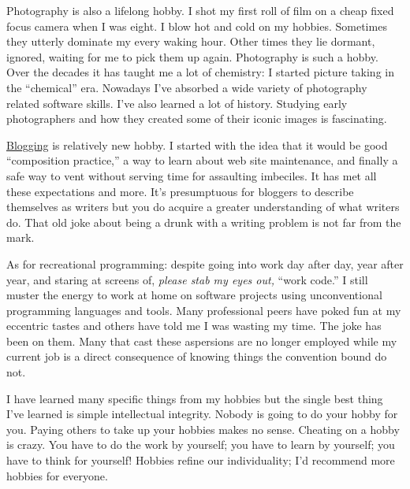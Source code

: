 Photography is also a lifelong hobby. I shot my first roll of film on a
cheap fixed focus camera when I was eight. I blow hot and cold on my
hobbies. Sometimes they utterly dominate my every waking hour. Other
times they lie dormant, ignored, waiting for me to pick them up again.
Photography is such a hobby. Over the decades it has taught me a lot of
chemistry: I started picture taking in the ``chemical'' era. Nowadays
I've absorbed a wide variety of photography related software skills.
I've also learned a lot of history. Studying early photographers and how
they created some of their iconic images is fascinating.

\href{https://bakerjd99.wordpress.com/}{Blogging} is relatively new
hobby. I started with the idea that it would be good ``composition
practice,'' a way to learn about web site maintenance, and finally a
safe way to vent without serving time for assaulting imbeciles. It has
met all these expectations and more. It's presumptuous for bloggers to
describe themselves as writers but you do acquire a greater
understanding of what writers do. That old joke about being a drunk with
a writing problem is not far from the mark.

As for recreational programming: despite going into work day after day,
year after year, and staring at screens of, \emph{please stab my eyes
out,} ``work code.'' I still muster the energy to work at home on
software projects using unconventional programming languages and tools.
Many professional peers have poked fun at my eccentric tastes and others
have told me I was wasting my time. The joke has been on them. Many that
cast these aspersions are no longer employed while my current job is a
direct consequence of knowing things the convention bound do not.

I have learned many specific things from my hobbies but the single best
thing I've learned is simple intellectual integrity. Nobody is going to
do your hobby for you. Paying others to take up your hobbies makes no
sense. Cheating on a hobby is crazy. You have to do the work by
yourself; you have to learn by yourself; you have to think for yourself!
Hobbies refine our individuality; I'd recommend more hobbies for
everyone.




%